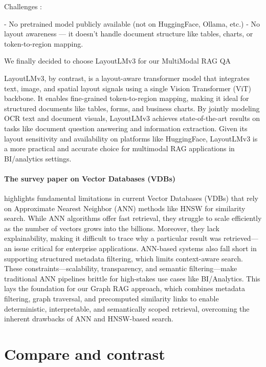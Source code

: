 \documentclass[11pt]{article}
\begin{document}
Challenges :

- No pretrained model publicly available (not on HuggingFace, Ollama, etc.)
- No layout awareness — it doesn’t handle document structure like tables, charts, or token-to-region mapping.


We finally decided to choose LayoutLMv3 for our MultiModal RAG QA 

LayoutLMv3, by contrast, is a layout-aware transformer model that integrates text, image, and spatial layout signals using a single Vision Transformer (ViT) backbone. It enables fine-grained token-to-region mapping, making it ideal for structured documents like tables, forms, and business charts. By jointly modeling OCR text and document visuals, LayoutLMv3 achieves state-of-the-art results on tasks like document question answering and information extraction. Given its layout sensitivity and availability on platforms like HuggingFace, LayoutLMv3 is a more practical and accurate choice for multimodal RAG applications in BI/analytics settings.

\paragraph{The survey paper on Vector Databases (VDBs)}
highlights fundamental limitations in current Vector Databases (VDBs) that rely on Approximate Nearest Neighbor (ANN) methods like HNSW for similarity search. While ANN algorithms offer fast retrieval, they struggle to scale efficiently as the number of vectors grows into the billions. Moreover, they lack explainability, making it difficult to trace why a particular result was retrieved—an issue critical for enterprise applications. ANN-based systems also fall short in supporting structured metadata filtering, which limits context-aware search. These constraints—scalability, transparency, and semantic filtering—make traditional ANN pipelines brittle for high-stakes use cases like BI/Analytics. This lays the foundation for our Graph RAG approach, which combines metadata filtering, graph traversal, and precomputed similarity links to enable deterministic, interpretable, and semantically scoped retrieval, overcoming the inherent drawbacks of ANN and HNSW-based search.


\section*{Compare and contrast} 
\end{document}
